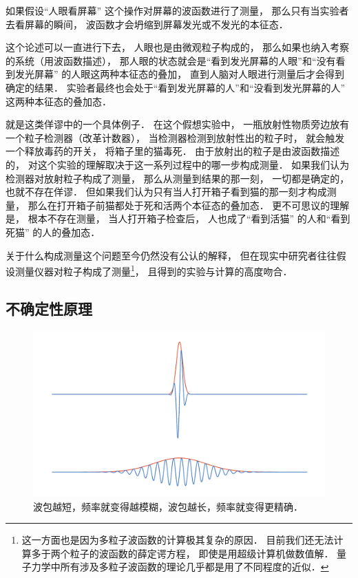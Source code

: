 如果假设“人眼看屏幕” 这个操作对屏幕的波函数进行了测量， 那么只有当实验者去看屏幕的瞬间， 波函数才会坍缩到屏幕发光或不发光的本征态．

这个论述可以一直进行下去， 人眼也是由微观粒子构成的， 那么如果也纳入考察的系统（用波函数描述）， 那人眼的状态就会是“看到发光屏幕的人眼”和“没有看到发光屏幕” 的人眼这两种本征态的叠加， 直到人脑对人眼进行测量后才会得到确定的结果． 实验者最终也会处于“看到发光屏幕的人”和“没看到发光屏幕的人” 这两种本征态的叠加态．

就是这类佯谬中的一个具体例子． 在这个假想实验中， 一瓶放射性物质旁边放有一个粒子检测器（改革计数器）， 当检测器检测到放射性出的粒子时， 就会触发一个释放毒药的开关， 将箱子里的猫毒死． 由于放射出的粒子是由波函数描述的， 对这个实验的理解取决于这一系列过程中的哪一步构成测量． 如果我们认为检测器对放射粒子构成了测量， 那么从测量到结果的那一刻， 一切都是确定的， 也就不存在佯谬． 但如果我们认为只有当人打开箱子看到猫的那一刻才构成测量， 那么在打开箱子前猫都处于死和活两个本征态的叠加态． 更不可思议的理解是， 根本不存在测量， 当人打开箱子检查后， 人也成了“看到活猫” 的人和“看到死猫” 的人的叠加态．

关于什么构成测量这个问题至今仍然没有公认的解释， 但在现实中研究者往往假设测量仪器对粒子构成了测量\footnote{这一方面也是因为多粒子波函数的计算极其复杂的原因． 目前我们还无法计算多于两个粒子的波函数的薛定谔方程， 即使是用超级计算机做数值解． 量子力学中所有涉及多粒子波函数的理论几乎都是用了不同程度的近似．}， 且得到的实验与计算的高度吻合．

\subsection{不确定性原理}

\begin{figure}[ht]
\centering
\includegraphics[width=14cm]{./figures/QM05.pdf}
\caption{波包越短，频率就变得越模糊，波包越长，频率就变得更精确．} \label{QM0_fig5}
\end{figure}

